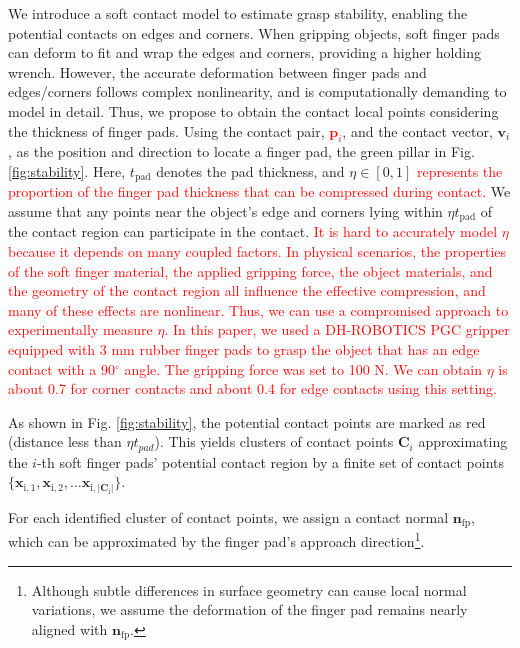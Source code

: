 \documentclass[journal]{IEEEtran}
\newcommand{\rev}[1]{\textcolor{red}{#1}}
\begin{document}

We introduce a soft contact model to estimate grasp stability, enabling the potential contacts on edges and corners. When gripping objects, soft finger pads can deform to fit and wrap the edges and corners, providing a higher holding wrench. However, the accurate deformation between finger pads and edges/corners follows complex nonlinearity, and is computationally demanding to model in detail. Thus, we propose to obtain the contact local points considering the thickness of finger pads. Using the contact pair, \rev{$\mathbf{p}_i$}, and the contact vector, $\mathbf{v}_i$, as the position and direction to locate a finger pad, the green pillar in Fig. \ref{fig:stability}.
Here, $t_\mathrm{pad}$ denotes the pad thickness, and  $\eta \in [0,1]$ \rev{represents the proportion of the finger pad thickness that can be compressed during contact.} We assume that any points near the object's edge and corners lying within $\eta t_\mathrm{pad}$ of the contact region can participate in the contact. 
\rev{It is hard to accurately model $\eta$ because it depends on many coupled factors. In physical scenarios, the properties of the soft finger material, the applied gripping force, the object materials, and the geometry of the contact region all influence the effective compression, and many of these effects are nonlinear. Thus, we can use a compromised approach to experimentally measure $\eta$. In this paper, we used a DH-ROBOTICS PGC gripper equipped with 3 mm rubber finger pads to grasp the object that has an edge contact with a 90$^\circ$ angle. The gripping force was set to 100 N. We can obtain $\eta$ is about 0.7 for corner contacts and about 0.4 for edge contacts using this setting.}

As shown in Fig. \ref{fig:stability}, the potential contact points are marked as red (distance less than $\eta t_{pad}$). This yields clusters of contact points $\mathbf{C}_i$ approximating the $i$-th soft finger pads' potential contact region by a finite set of contact points $\{\mathbf{x}_\mathrm{i,1}, \mathbf{x}_\mathrm{i,2}, \ldots \mathbf{x}_\mathrm{i,|\mathbf{C}_i|}\}$.

For each identified cluster of contact points, we assign a contact normal $\mathbf{n}_\mathrm{fp}$, which can be approximated by the finger pad’s approach direction\footnote{Although subtle differences in surface geometry can cause local normal variations, we assume the deformation of the finger pad remains nearly aligned with $\mathbf{n}_\mathrm{fp}$.}.  
\end{document}
